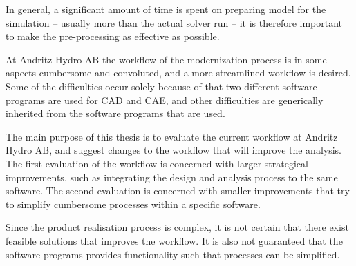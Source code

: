 
In general, a significant amount of time is spent on preparing model for the simulation -- usually more than the actual solver run -- it is therefore important to make the pre-processing as effective as possible.

At Andritz Hydro AB the workflow of the modernization process is in some aspects cumbersome and convoluted, and a more streamlined workflow is desired. Some of the difficulties occur solely because of that two different software programs are used for CAD and CAE, and other difficulties are generically inherited from the software programs that are used.

The main purpose of this thesis is to evaluate the current workflow at Andritz Hydro AB, and suggest changes to the workflow that will improve the analysis. The first evaluation of the workflow is concerned with larger strategical improvements, such as integrating the design and analysis process to the same software. The second evaluation is concerned with smaller improvements that try to simplify cumbersome processes within a specific software.

Since the product realisation process is complex, it is not certain that there exist feasible solutions that improves the workflow. It is also not guaranteed that the software programs provides functionality such that processes can be simplified.


